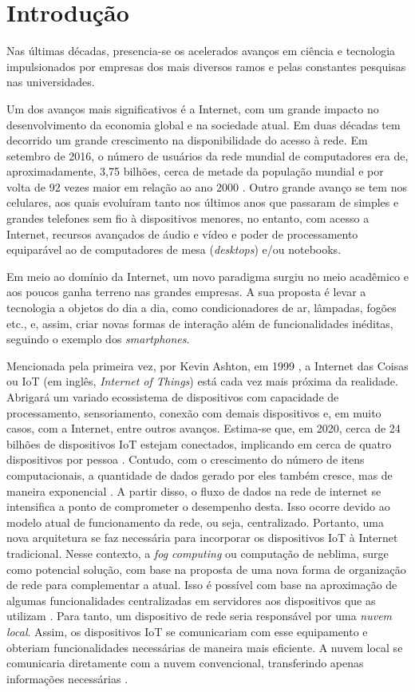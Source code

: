 \chapter{Introdução}

Nas últimas décadas, presencia-se os acelerados avanços em ciência e tecnologia impulsionados por empresas dos mais diversos ramos e pelas constantes pesquisas nas universidades. 

Um dos avanços mais significativos é a Internet, com um grande impacto no desenvolvimento da economia global e na sociedade atual. Em duas décadas tem decorrido um grande crescimento na disponibilidade do acesso à rede. Em setembro de 2016, o número de usuários da rede mundial de computadores era de, aproximadamente, 3,75 bilhões, cerca de metade da população mundial e por volta de 92 vezes maior em relação ao ano 2000 \cite{MiniwattsMarketingGroup2016}.  Outro grande avanço se tem nos celulares, aos quais evoluíram tanto nos últimos anos que passaram de simples e grandes telefones sem fio à dispositivos menores, no entanto, com acesso a Internet, recursos avançados de áudio e vídeo e poder de processamento equiparável ao de computadores de mesa (\textit{desktops}) e/ou notebooks.

Em meio ao domínio da Internet, um novo paradigma surgiu no meio acadêmico e aos poucos ganha terreno nas grandes empresas. A sua proposta é levar a tecnologia a objetos do dia a dia, como condicionadores de ar, lâmpadas, fogões etc., e, assim, criar novas formas de interação além de funcionalidades inéditas, seguindo o exemplo dos \textit{smartphones}. 

Mencionada pela primeira vez, por Kevin Ashton, em 1999 \cite{kevin-ashton}, a Internet das Coisas ou IoT (em inglês, \textit{Internet of Things}) está cada vez mais próxima da realidade. Abrigará um variado ecossistema de dispositivos com capacidade de processamento, sensoriamento, conexão com demais dispositivos e, em muito casos, com a Internet, entre outros avanços. Estima-se que, em 2020, cerca de 24 bilhões de dispositivos IoT estejam conectados, implicando em cerca de quatro dispositivos por pessoa \cite{Meola2016}.   
Contudo, com o crescimento do número de itens computacionais, a quantidade de dados gerado por eles também cresce, mas de maneira exponencial \cite{Chiang2016}. A partir disso, o fluxo de dados na rede de internet se intensifica a ponto de comprometer o desempenho desta. Isso ocorre devido ao modelo atual de funcionamento da rede, ou seja, centralizado. Portanto, uma nova arquitetura se faz necessária para incorporar os dispositivos IoT à Internet tradicional. %
Nesse contexto, a \textit{fog computing} ou computação de neblima, surge como potencial solução, com base na proposta de uma nova forma de organização de rede para complementar a atual. Isso é possível com base na aproximação de algumas funcionalidades centralizadas em servidores aos dispositivos que as utilizam \cite{Chiang2016}. Para tanto, um dispositivo de rede seria responsável por uma \textit{nuvem local}. Assim, os dispositivos IoT se comunicariam com esse equipamento e obteriam funcionalidades necessárias de maneira mais eficiente. A nuvem local se comunicaria diretamente com a nuvem convencional, transferindo apenas informações necessárias \cite{Syed2016}.

